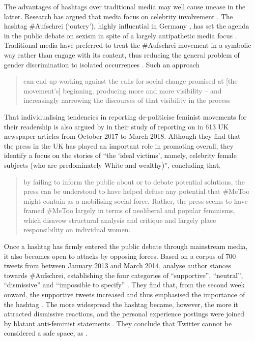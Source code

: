 \documentclass[output=paper,english,spanish,german,english]{langsci/langscibook}
\begin{document}
The advantages of hashtags over traditional media may well cause unease in the latter. Research has argued that media focus on celebrity involvement . The hashtag \#Aufschrei (`outcry'), highly influential in Germany \parencite[see][]{maisch14}, has set the agenda in the public debate on sexism in spite of a largely antipathetic media focus \parencite[381]{kornemann18}. Traditional media have preferred to treat the \#Aufschrei movement in a symbolic way rather than engage with its content, thus reducing the general problem of gender discrimination to isolated occurrences \parencite[386]{kornemann18}. Such an approach \blockcquote[17]{banet18}{can end up working against the calls for social change promised at [the movement's] beginning, producing more and more visibility -- and increasingly narrowing the discourses of that visibility in the process}.

That individualising tendencies in reporting de-politicise feminist movements for their readership is also argued by \textcite[733]{benetal19} in their study of reporting on \mt in 613 UK newspaper articles from October 2017 to March 2018. Although they find that the press in the UK has played an important role in promoting \mt overall, they identify a focus on the stories of \enquote{the \enquote{ideal victims}, namely, celebrity female subjects (who are predominately White and wealthy)}, concluding that, \blockcquote[734]{benetal19}{by failing to inform the public about or to debate potential solutions, the press can be understood to have helped defuse any potential that \#MeToo might contain as a mobilising social force. Rather, the press seems to have framed \#MeToo largely in terms of neoliberal and popular feminisms, which disavow structural analysis and critique and largely place responsibility on individual women.}

\noindent Once a hashtag has firmly entered the public debate through mainstream media, it also becomes open to attacks by opposing forces. Based on a corpus of 700 tweets from between January 2013 and March 2014, \textcite{druzob16} analyse author stances towards \#Aufschrei, establishing the four categories of \enquote{supportive}, \enquote{neutral}, \enquote{dismissive} and \enquote{impossible to specify} \parencite[43]{druzob16}. They find that, from the second week onward, the supportive tweets increased and thus emphasised the importance of the hashtag \parencite[44--45]{druzob16}. The more widespread the hashtag became, however, the more it attracted dismissive reactions, and the personal experience postings were joined by blatant anti-feminist statements \parencite[44--45]{druzob16}. They conclude that Twitter cannot be considered a safe space, as .
\end{document}

